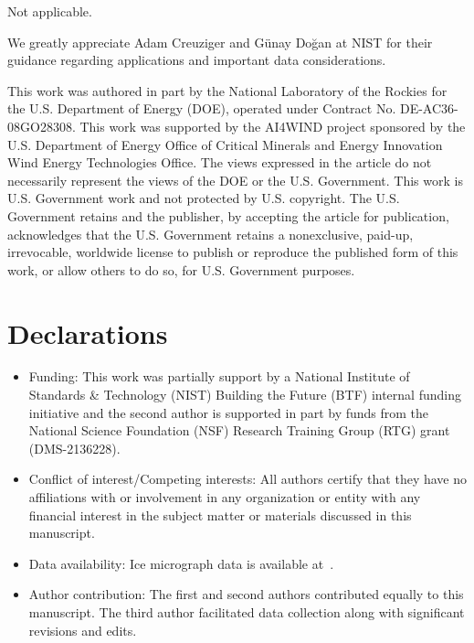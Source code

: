 \documentclass[pdflatex,iicol]{sn-jnl}%
\theoremstyle{thmstyleone}%
\theoremstyle{thmstyletwo}%
\theoremstyle{thmstylethree}%
\begin{document}
Not applicable.

We greatly appreciate Adam Creuziger and G\"unay Do\u{g}an at NIST for their guidance regarding applications and important data considerations.

This work was authored in part by the National Laboratory of the Rockies for the U.S. Department of Energy (DOE), operated under Contract No. DE-AC36-08GO28308. This work was supported by the AI4WIND project sponsored by the U.S. Department of Energy Office of Critical Minerals and Energy Innovation Wind Energy Technologies Office. The views expressed in the article do not necessarily represent the views of the DOE or the U.S. Government. This work is U.S. Government work and not protected by U.S. copyright. The U.S. Government retains and the publisher, by accepting the article for publication, acknowledges that the U.S. Government retains a nonexclusive, paid-up, irrevocable, worldwide license to publish or reproduce the published form of this work, or allow others to do so, for U.S. Government purposes.


\section*{Declarations}

\begin{itemize}
\item Funding: This work was partially support by a National Institute of Standards \& Technology (NIST) Building the Future (BTF) internal funding initiative and the second author is supported in part by funds from the National Science Foundation (NSF) Research Training Group (RTG) grant (DMS-2136228).
\item Conflict of interest/Competing interests: All authors certify that they have no affiliations with or involvement in any organization or entity with any financial interest in the subject matter or materials discussed in this manuscript.
\item Data availability: Ice micrograph data is available at~\cite{Fan2020}. 
\item Author contribution: The first and second authors contributed equally to this manuscript. The third author facilitated data collection along with significant revisions and edits.
\end{itemize}
\end{document}
